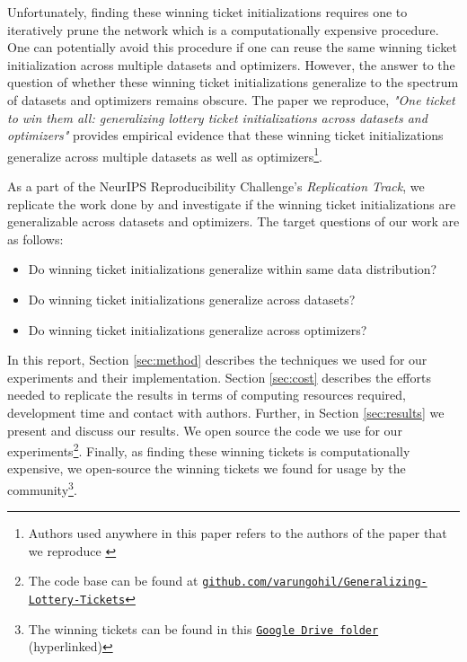 \documentclass{article}
\begin{document}
Unfortunately, finding these winning ticket initializations requires one to iteratively prune the network which is a computationally expensive procedure. One can potentially avoid this procedure if one can reuse the same winning ticket initialization across multiple datasets and optimizers. However, the answer to the question of whether these winning ticket initializations generalize to the spectrum of datasets and optimizers remains obscure. The paper we reproduce,  \textit{"One ticket to win them all: generalizing lottery ticket initializations across datasets and optimizers"} \cite{repro_paper} provides empirical evidence that these winning ticket initializations generalize across multiple datasets as well as optimizers\footnote{Authors used anywhere in this paper refers to the authors of the paper that we reproduce \cite{repro_paper}}.
 
 
As a part of the NeurIPS Reproducibility Challenge's \textit{Replication Track}, we replicate the work done by \cite{repro_paper} and investigate if the winning ticket initializations are generalizable across datasets and optimizers. The target questions of our work are as follows:
\begin{itemize}
    \item Do winning ticket initializations generalize within same data distribution?
    \item Do winning ticket initializations generalize across datasets?
    \item Do winning ticket initializations generalize across optimizers?
\end{itemize}

In this report, Section \ref{sec:method} describes the techniques we used for our experiments and their implementation.  Section \ref{sec:cost} describes the efforts needed to replicate the results in terms of computing resources required, development time and contact with authors. Further, in Section \ref{sec:results} we present and discuss our results. We open source the code we use for our experiments\footnote{The code base can be found at \href{https://github.com/varungohil/Generalizing-Lottery-Tickets}{\texttt{github.com/varungohil/Generalizing-Lottery-Tickets}}}. Finally, as finding these winning tickets is computationally expensive, we open-source the winning tickets we found for usage by the community\footnote{The winning tickets can be found in this  \href{https://drive.google.com/drive/folders/1Nd-J4EwmgWbUARYaqe9iCF6efEFf9S2P?usp=sharing}{\texttt{Google Drive folder}} (hyperlinked)}. 
\end{document}
